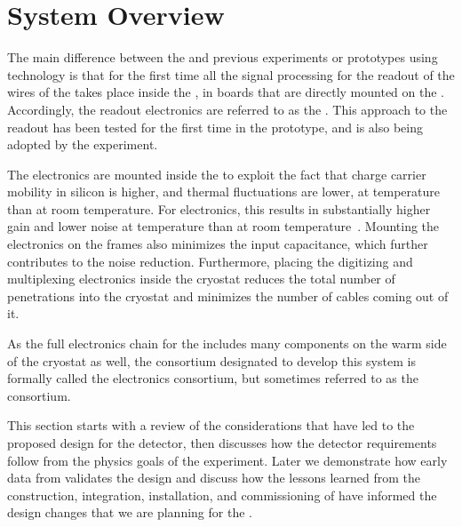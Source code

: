 \section{System Overview}
\label{sec:fdsp-tpcelec-overview}

The main difference between the    
and previous experiments or prototypes using  technology is
that for the first time all the signal processing for the readout of the
wires of the  takes place inside the , in boards that 
are directly mounted on the . Accordingly, the  readout
electronics are referred to as the . This approach to the 
readout has been tested for the first time in the  prototype,
and is also being adopted by the  experiment.

The electronics are mounted inside the  to exploit the fact that 
charge carrier mobility in silicon is higher, and thermal fluctuations are lower,  
at  temperature than at room temperature. For  
electronics, this results in substantially higher gain and lower noise 
at  temperature than at room temperature~\cite{DeGeronimo:2011zz}.
Mounting the  electronics on the  frames also minimizes 
the input capacitance, which further contributes to the noise reduction.  
Furthermore, placing the digitizing and multiplexing electronics inside 
the cryostat reduces the total number of penetrations into the cryostat 
and minimizes the number of cables coming out of it.

As the full  electronics chain for the  includes 
many components on the warm side of the cryostat as well, the  
consortium designated to develop this system is formally called 
the    electronics consortium, but 
sometimes referred to as the  consortium.

This section starts with a review of the considerations that
have led to the proposed design for the   detector, 
then discusses how the detector requirements follow 
from the physics goals of the experiment.
Later we demonstrate how early data from  
validates the design and 
discuss how the lessons learned from the construction,
integration, installation, and commissioning of  have 
informed the design changes that we are planning for the 
.

